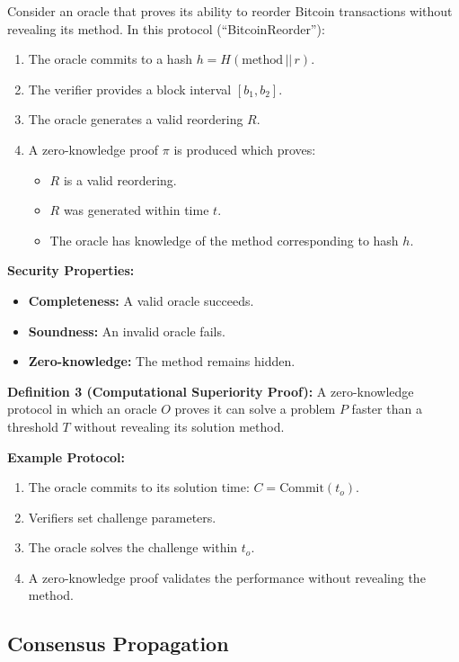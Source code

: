 \documentclass[11pt]{article}
\begin{document}
Consider an oracle that proves its ability to reorder Bitcoin transactions without revealing its method. In this protocol (``BitcoinReorder''):
\begin{enumerate}[label=(\arabic*)]
    \item The oracle commits to a hash $h = H(\text{method} \, || \, r)$.
    \item The verifier provides a block interval $[b_1, b_2]$.
    \item The oracle generates a valid reordering $R$.
    \item A zero-knowledge proof $\pi$ is produced which proves:
    \begin{itemize}
        \item $R$ is a valid reordering.
        \item $R$ was generated within time $t$.
        \item The oracle has knowledge of the method corresponding to hash $h$.
    \end{itemize}
\end{enumerate}

\noindent\textbf{Security Properties:}
\begin{itemize}
    \item \textbf{Completeness:} A valid oracle succeeds.
    \item \textbf{Soundness:} An invalid oracle fails.
    \item \textbf{Zero-knowledge:} The method remains hidden.
\end{itemize}

\noindent
\textbf{Definition 3 (Computational Superiority Proof):} A zero-knowledge protocol in which an oracle $O$ proves it can solve a problem $P$ faster than a threshold $T$ without revealing its solution method.

\noindent
\textbf{Example Protocol:}
\begin{enumerate}[label=(\arabic*)]
    \item The oracle commits to its solution time: $C = \text{Commit}(t_o)$.
    \item Verifiers set challenge parameters.
    \item The oracle solves the challenge within $t_o$.
    \item A zero-knowledge proof validates the performance without revealing the method.
\end{enumerate}

\subsection{Consensus Propagation}
\end{document}
